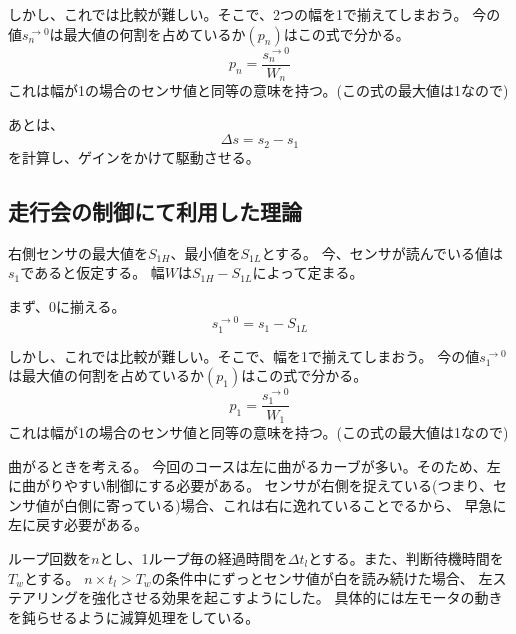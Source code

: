 \documentclass[a4paper]{ltjsarticle}
\begin{document}
しかし、これでは比較が難しい。そこで、2つの幅を1で揃えてしまおう。
今の値$s^{\to 0}_{n}$は最大値の何割を占めているか$(p_n)$はこの式で分かる。
\begin{equation}
  p_n=\frac{s^{\to 0}_n}{W_n}
\end{equation}
これは幅が1の場合のセンサ値と同等の意味を持つ。(この式の最大値は1なので)

あとは、
\begin{equation}
  \Delta s = s_2-s_1
\end{equation}
を計算し、ゲインをかけて駆動させる。

\subsection{走行会の制御にて利用した理論}
右側センサの最大値を$S_{1H}$、最小値を$S_{1L}$とする。
今、センサが読んでいる値は$s_{1}$であると仮定する。
幅$W$は$S_{1H}-S_{1L}$によって定まる。

まず、0に揃える。
\begin{equation}
  s^{\to 0}_{1} = s_1-S_{1L}
\end{equation}

しかし、これでは比較が難しい。そこで、幅を1で揃えてしまおう。
今の値$s^{\to 0}_{1}$は最大値の何割を占めているか$(p_1)$はこの式で分かる。
\begin{equation}
  p_1=\frac{s^{\to 0}_1}{W_1}
\end{equation}
これは幅が1の場合のセンサ値と同等の意味を持つ。(この式の最大値は1なので)

曲がるときを考える。
今回のコースは左に曲がるカーブが多い。そのため、左に曲がりやすい制御にする必要がある。
センサが右側を捉えている(つまり、センサ値が白側に寄っている)場合、これは右に逸れていることでるから、
早急に左に戻す必要がある。

ループ回数を$n$とし、1ループ毎の経過時間を$\Delta t_l$とする。また、判断待機時間を$T_w$とする。
$n \times t_l > T_w$の条件中にずっとセンサ値が白を読み続けた場合、
左ステアリングを強化させる効果を起こすようにした。
具体的には左モータの動きを鈍らせるように減算処理をしている。
\end{document}
